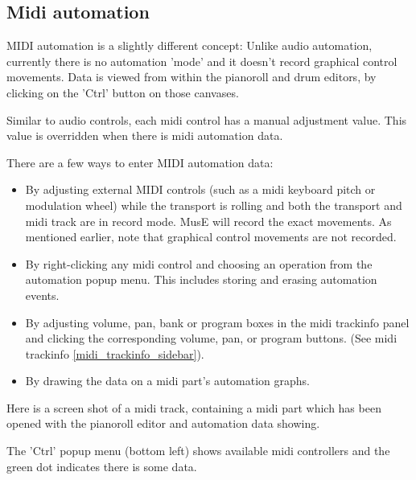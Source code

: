 \documentclass[a4paper]{report}
\begin{document}
\label{midi_automation} \subsection{Midi automation} 
MIDI automation is a slightly different concept: Unlike audio
automation, currently there is no automation 'mode' and it doesn't
record graphical control movements. Data is viewed from within
the pianoroll and drum editors, by clicking on the 'Ctrl' button               %
on those canvases.
                                       
Similar to audio controls, each midi control has a manual adjustment
value. This value is overridden when there is midi automation data.

There are a few ways to enter MIDI automation data:
\begin{itemize}
\item By adjusting external MIDI controls (such as a midi keyboard
pitch or modulation wheel) while the transport is rolling and both
the transport and midi track are in record mode. MusE will record
the exact movements. As mentioned earlier, note that graphical control
movements are not recorded.                                                    %
\item By right-clicking any midi control and choosing an operation
from the automation popup menu. This includes storing and erasing
automation events.                                                             %
\item By adjusting volume, pan, bank or program boxes in the midi
trackinfo panel and clicking the corresponding volume, pan, or 
program buttons. (See midi trackinfo \ref{midi_trackinfo_sidebar}).
\item By drawing the data on a midi part's automation graphs.
\end{itemize}
Here is a screen shot of a midi track, containing a midi part
which has been opened with the pianoroll editor and automation                 %
data showing.
                                                         
The 'Ctrl' popup menu (bottom left) shows available midi controllers
and the green dot indicates there is some data.
\end{document}
